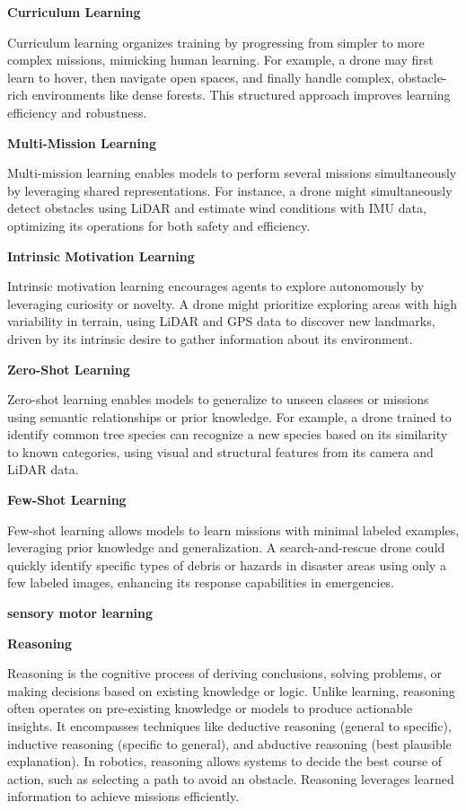\documentclass{book}
\providecommand{\ProjectDeepHeading}[2]{%
    \par\medskip\noindent\textbf{#2}\par\smallskip
}
\begin{document}
\ProjectDeepHeading{4}{Curriculum Learning}
Curriculum learning organizes training by progressing from simpler to more complex missions, mimicking human learning. For example, a drone may first learn to hover, then navigate open spaces, and finally handle complex, obstacle-rich environments like dense forests. This structured approach improves learning efficiency and robustness.

\ProjectDeepHeading{4}{Multi-Mission Learning}
Multi-mission learning enables models to perform several missions simultaneously by leveraging shared representations. For instance, a drone might simultaneously detect obstacles using LiDAR and estimate wind conditions with IMU data, optimizing its operations for both safety and efficiency.

\ProjectDeepHeading{4}{Intrinsic Motivation Learning}
Intrinsic motivation learning encourages agents to explore autonomously by leveraging curiosity or novelty. A drone might prioritize exploring areas with high variability in terrain, using LiDAR and GPS data to discover new landmarks, driven by its intrinsic desire to gather information about its environment. 

\ProjectDeepHeading{4}{Zero-Shot Learning}
Zero-shot learning enables models to generalize to unseen classes or missions using semantic relationships or prior knowledge. For example, a drone trained to identify common tree species can recognize a new species based on its similarity to known categories, using visual and structural features from its camera and LiDAR data.

\ProjectDeepHeading{4}{Few-Shot Learning}
Few-shot learning allows models to learn missions with minimal labeled examples, leveraging prior knowledge and generalization. A search-and-rescue drone could quickly identify specific types of debris or hazards in disaster areas using only a few labeled images, enhancing its response capabilities in emergencies.

\ProjectDeepHeading{4}{sensory motor learning}

\ProjectDeepHeading{3}{Reasoning}
Reasoning is the cognitive process of deriving conclusions, solving problems, or making decisions based on existing knowledge or logic. Unlike learning, reasoning often operates on pre-existing knowledge or models to produce actionable insights. It encompasses techniques like deductive reasoning (general to specific), inductive reasoning (specific to general), and abductive reasoning (best plausible explanation). In robotics, reasoning allows systems to decide the best course of action, such as selecting a path to avoid an obstacle. Reasoning leverages learned information to achieve missions efficiently.
\end{document}
